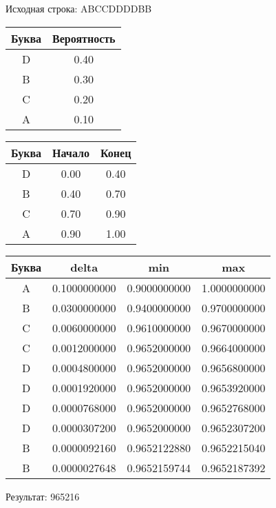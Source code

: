 \documentclass[a4paper, 12pt]{article}
\begin{document}
Исходная строка: ABCCDDDDBB\
\begin{center}
 \begin{tabular}{ |c|c| } 
  \hline
     Буква & Вероятность \\ \hline
D & 0.40\\\hline
B & 0.30\\\hline
C & 0.20\\\hline
A & 0.10
\\ \hline \end{tabular}
\end{center}
\begin{center}
 \begin{tabular}{ |c|c|c| } 
  \hline
     Буква & Начало & Конец \\ \hline
D & 0.00 & 0.40\\\hline
B & 0.40 & 0.70\\\hline
C & 0.70 & 0.90\\\hline
A & 0.90 & 1.00
\\ \hline \end{tabular}
\end{center}
\begin{center}
 \begin{tabular}{ |c|c|c|c| } 
  \hline
     Буква & delta & min & max \\ \hline
A & 0.1000000000 & 0.9000000000 & 1.0000000000\\\hline
B & 0.0300000000 & 0.9400000000 & 0.9700000000\\\hline
C & 0.0060000000 & 0.9610000000 & 0.9670000000\\\hline
C & 0.0012000000 & 0.9652000000 & 0.9664000000\\\hline
D & 0.0004800000 & 0.9652000000 & 0.9656800000\\\hline
D & 0.0001920000 & 0.9652000000 & 0.9653920000\\\hline
D & 0.0000768000 & 0.9652000000 & 0.9652768000\\\hline
D & 0.0000307200 & 0.9652000000 & 0.9652307200\\\hline
B & 0.0000092160 & 0.9652122880 & 0.9652215040\\\hline
B & 0.0000027648 & 0.9652159744 & 0.9652187392
\\ \hline \end{tabular}
\end{center}
Результат: 965216
\pagebreak
\end{document}

